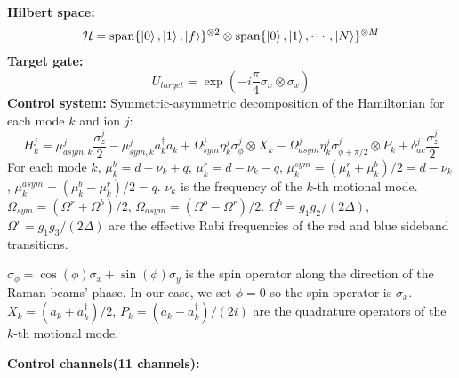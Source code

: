 \documentclass{simple-notes}
\begin{document}
\begin{notebox}[title=System Receipt]
\textbf{Hilbert space:} 
\begin{equation}
    \mathcal{H} = \text{span}\{\ket{0},\ket{1},\ket{f}\}^{\otimes 2}\otimes \text{span}\{\ket{0},\ket{1},\cdots,\ket{N}\}^{\otimes M}
\end{equation}
\textbf{Target gate:}
\begin{equation}
    U_{target} = \exp(-i\frac{\pi}{4}\sigma_x\otimes\sigma_x)
\end{equation}
\textbf{Control system:}
Symmetric-asymmetric decomposition of the Hamiltonian for each mode $k$ and ion $j$:
\begin{equation}
    H_k^j = \mu_{asym, k}^j\frac{\sigma_z^j}{2} - \mu_{sym, k}^j a^\dagger_k a_k + \Omega^{j}_{sym} \eta_k^j\sigma^j_{\phi}\otimes X_k -\Omega^{j}_{asym}\eta_k^j\sigma^j_{\phi+\pi/2}\otimes P_k + \delta_{ac}^j\frac{\sigma_z^j}{2} 
\end{equation}
For each mode $k$, $\mu_k^b = d-\nu_k+q$, $\mu_k^r = d-\nu_k-q$, $\mu_k^{sym} = (\mu_k^r + \mu_k^b)/2 = d-\nu_k$, $\mu_k^{asym} = (\mu_k^b - \mu_k^r)/2 = q$.
$\nu_k$ is the frequency of the $k$-th motional mode. $\Omega_{sym} = (\Omega^r + \Omega^b)/2$, $\Omega_{asym} = (\Omega^b - \Omega^r)/2$. $\Omega^b = g_1 g_2/(2\Delta)$, $\Omega^r = g_1 g_3/(2\Delta)$ are the effective Rabi frequencies of the red and blue sideband transitions.

$\sigma_{\phi} = \cos(\phi)\sigma_x + \sin(\phi)\sigma_y$ is the spin operator along the direction of the Raman beams' phase. In our case, we set $\phi = 0$ so the spin operator is $\sigma_x$. $X_k = (a_k + a_k^\dagger)/2$, $P_k = (a_k - a_k^\dagger)/(2i)$ are the quadrature operators of the $k$-th motional mode.


\textbf{Control channels(11 channels):}


\end{notebox}
\end{document}
